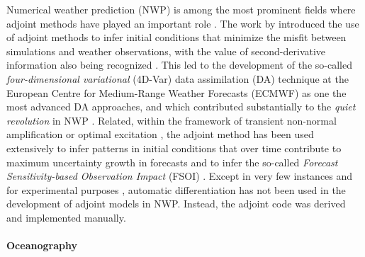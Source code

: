 Numerical weather prediction (NWP) is among the most prominent fields where adjoint methods have played an important role \cite{Errico_1997}. 
The work by \cite{Talagrand.1987,Courtier.1987} introduced the use of adjoint methods to infer initial conditions that minimize the misfit between simulations and weather observations, with the value of second-derivative information also being recognized \cite{Dimet.2002}. 
This led to the development of the so-called \textit{four-dimensional variational} (4D-Var) data assimilation (DA) technique \cite{Rabier.1992,Rabier:2000uu} at the European Centre for Medium-Range Weather Forecasts (ECMWF) as one the most advanced DA approaches, and which contributed substantially to the \textit{quiet revolution} in NWP \cite{Bauer.2015}.
Related, within the framework of transient non-normal amplification or optimal excitation \cite{Farrell.1988,Farrell:1996jx}, the adjoint method has been used extensively to infer patterns in initial conditions that over time contribute to maximum uncertainty growth in forecasts \cite{Palmer:1994br,Buizza:1995in} and to infer the so-called \textit{Forecast Sensitivity-based Observation Impact} (FSOI) \cite{Langland:2004jo}.
Except in very few instances and for experimental purposes \cite{Giering.2006}, automatic differentiation has not been used in the development of adjoint models in NWP.
Instead, the adjoint code was derived and implemented manually.

\paragraph{Oceanography}

